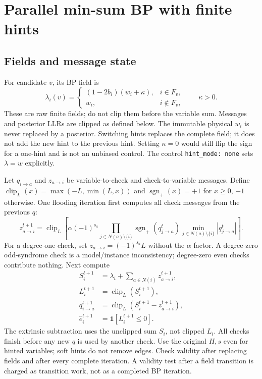 \documentclass[11pt,a4paper]{article}
\newcommand{\clip}{\operatorname{clip}}
\newcommand{\sgn}{\operatorname{sgn}_{+}}
\newcommand{\code}[1]{\nolinkurl{#1}}
\begin{document}
\section{Parallel min-sum BP with finite hints}
\subsection{Fields and message state}
For candidate $v$, its BP field is
\begin{equation}\label{eq:fields}
 \lambda_i(v)=\begin{cases}
 (1-2b_i)(w_i+\kappa),&i\in F_v,\\
 w_i,&i\notin F_v,
 \end{cases}\qquad \kappa>0.
\end{equation}
These are raw finite fields; do not clip them before the variable sum. Messages and posterior LLRs are clipped as defined below. The immutable physical $w_i$ is never replaced by a posterior. Switching hints replaces the complete field; it does not add the new hint to the previous hint. Setting $\kappa=0$ would still flip the sign for a one-hint and is not an unbiased control. The control \code{hint_mode: none} sets $\lambda=w$ explicitly.

Let $q_{i\to a}$ and $z_{a\to i}$ be variable-to-check and check-to-variable messages. Define $\clip_L(x)=\max(-L,\min(L,x))$ and $\sgn(x)=+1$ for $x\geq0$, $-1$ otherwise. One flooding iteration first computes all check messages from the previous $q$:
\begin{equation}\label{eq:check}
 z_{a\to i}^{t+1}=\clip_L\!\left[
 \alpha(-1)^{s_a}\prod_{j\in N(a)\setminus\{i\}}\sgn(q_{j\to a}^{t})
 \min_{j\in N(a)\setminus\{i\}}|q_{j\to a}^{t}|
 \right].
\end{equation}
For a degree-one check, set $z_{a\to i}=(-1)^{s_a}L$ without the $\alpha$ factor. A degree-zero odd-syndrome check is a model/instance inconsistency; degree-zero even checks contribute nothing. Next compute
\begin{align}
 S_i^{t+1}&=\lambda_i+\sum_{a\in N(i)}z_{a\to i}^{t+1},\\
 L_i^{t+1}&=\clip_L(S_i^{t+1}),\\
 q_{i\to a}^{t+1}&=\clip_L(S_i^{t+1}-z_{a\to i}^{t+1}),\\
 \hat e_i^{t+1}&=\mathbf1[L_i^{t+1}\leq0].
\end{align}
The extrinsic subtraction uses the unclipped sum $S_i$, not clipped $L_i$. All checks finish before any new $q$ is used by another check. Use the original $H,s$ even for hinted variables; soft hints do not remove edges. Check validity after replacing fields and after every complete iteration. A validity test after a field transition is charged as transition work, not as a completed BP iteration.
\end{document}
